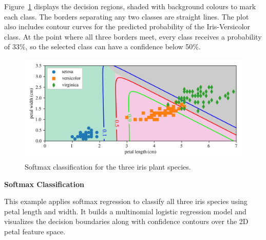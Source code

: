 \documentclass[12pt,letter]{article}
\begin{document}
Figure~\ref{fig:Softmax_classification} displays the decision regions, shaded with background colours to mark each class. The borders separating any two classes are straight lines. The plot also includes contour curves for the predicted probability of the Iris-Versicolor class. At the point where all three borders meet, every class receives a probability of 33\%, so the selected class can have a confidence below 50\%.


\begin{figure}[H]
	\centering
	\includegraphics[width=5.5in]{../figures/Softmax_classification.png}
	\caption{Softmax classification for the three iris plant species.}
	\label{fig:Softmax_classification}
\end{figure}



\begin{example}
\textbf{Softmax Classification}

\noindent This example applies softmax regression to classify all three iris species using petal length and width. It builds a multinomial logistic regression model and visualizes the decision boundaries along with confidence contours over the 2D petal feature space.
\end{example}

\pagebreak




\end{document}
